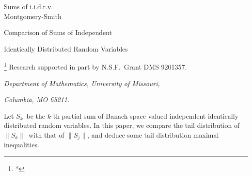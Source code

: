 \def\normo#1{{\left\| #1 \right\|}}
\def\snormo#1{{\mathopen\| #1 \mathclose\|}}
\def\bignormo#1{{\bigl\| #1 \bigr\|}}
\def\Bignormo#1{{\Bigl\| #1 \Bigr\|}}
\def\biggnormo#1{{\biggl\| #1 \biggr\|}}
\def\Biggnormo#1{{\Biggl\| #1 \Biggr\|}}

\def\widedot{\,\cdot\,}
\def\normdot{\normo{\widedot}}
\def\trinormo#1{\left|\left|\left| #1 \right|\right|\right|}
\def\trinormdot{\trinormo{\widedot}}

\def\modo#1{{\left| #1 \right|}}
\def\smodo#1{{\mathopen| #1 \mathclose|}}
\def\bigmodo#1{{\bigl| #1 \bigr|}}
\def\Bigmodo#1{{\Bigl| #1 \Bigr|}}
\def\biggmodo#1{{\biggl| #1 \biggr|}}
\def\Biggmodo#1{{\Biggl| #1 \Biggr|}}

\def\angleo#1{{\left\langle #1 \right\rangle}}
\def\sangleo#1{{\mathopen\langle #1 \mathclose\rangle}}
\def\bigangleo#1{{\bigl\langle #1 \bigr\rangle}}
\def\Bigangleo#1{{\Bigl\langle #1 \Bigr\rangle}}
\def\biggangleo#1{{\biggl\langle #1 \biggr\rangle}}
\def\Biggangleo#1{{\Biggl\langle #1 \Biggr\rangle}}

\def\dom#1{{\vert_{#1}}}

\def\implies{$\Rightarrow$}
\def\iff{$\Leftrightarrow$}

\def\sign{\mathop{\hbox{\rm sign}}}


\def\and{\mathop{\hbox{\ and\ }}}


\noblankout

\setheadline Sums of i.i.d.r.v.\\
             Montgomery-Smith

{
\seventeenpoint
\centerline{Comparison of Sums of Independent}
\smallskip
\centerline{Identically Distributed Random Variables}
}
\bigskip\bigskip\medskip
\centerline{%
\footnote{*}%
{Research supported in part by N.S.F.\ Grant
DMS 9201357.}%
}
\smallskip
{
\eightpoint
\centerline{\it Department of Mathematics, University of Missouri,}
\centerline{\it Columbia, MO 65211.}
}
\bigskip\bigskip

\Abstract

Let $S_k$\ be the $k$-th partial sum of Banach space valued
independent identically distributed
random variables.  In this paper, we compare the tail
distribution of $\snormo{S_k}$\ with that of
$\snormo{S_j}$, and 
deduce
some tail distribution maximal inequalities.

